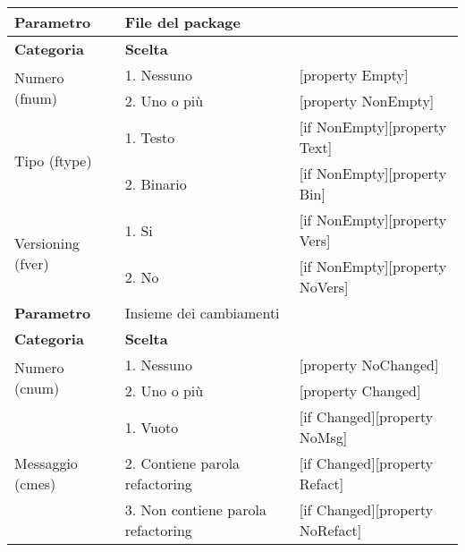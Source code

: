 \begin{tabular}{|p{4cm}|p{4cm}p{5cm}|}
	\hline
	\cellcolor{Gray} \textbf{Parametro}		& File del package	&									\tabularnewline
	\hline
	\rowcolor{Gray}
	\textbf{Categoria} 						& \textbf{Scelta}			&									\tabularnewline
	\hline
	\multirow{2}{*}{Numero (fnum)} 			& 1. Nessuno 				&	[property Empty] 				\tabularnewline
	\cline{2-3}
											& 2. Uno o più				&	[property NonEmpty]				\tabularnewline
	\hline
	\multirow{2}{*}{Tipo (ftype)} 			& 1. Testo					&	[if NonEmpty][property Text] 	\tabularnewline
	\cline{2-3}
											& 2. Binario				&	[if NonEmpty][property Bin]		\tabularnewline
	\hline
	\multirow{2}{*}{Versioning (fver)}		& 1. Si						&	[if NonEmpty][property Vers]	\tabularnewline
	\cline{2-3}
											& 2. No						&	[if NonEmpty][property NoVers]	\tabularnewline
	\hline
	
	
	\cellcolor{Gray} \textbf{Parametro}		& Insieme dei cambiamenti	&									\tabularnewline
	\hline
	\rowcolor{Gray}
	\textbf{Categoria} 						& \textbf{Scelta}			&									\tabularnewline
	\hline
	\multirow{2}{*}{Numero (cnum)} 			& 1. Nessuno 				&	[property NoChanged]			\tabularnewline
	\cline{2-3}
											& 2. Uno o più				&	[property Changed]				\tabularnewline
	\hline
	\multirow{3}{*}{Messaggio (cmes)} 		& 1. Vuoto 					&	[if Changed][property NoMsg] 	\tabularnewline
	\cline{2-3}
											& 2. Contiene parola refactoring 		&	[if Changed][property Refact]		\tabularnewline
	\cline{2-3}
											& 3. Non contiene parola refactoring	&	[if Changed][property NoRefact]		\tabularnewline
	
	\hline			
	
\end{tabular}

\vspace{1cm}

